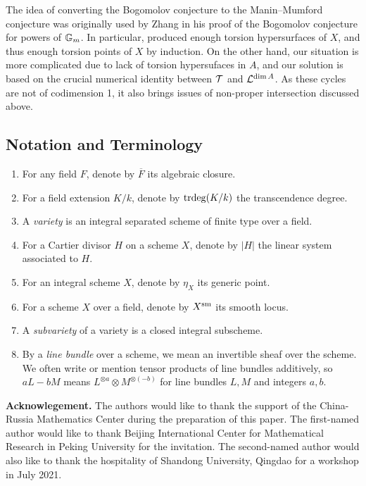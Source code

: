 The idea of converting the Bogomolov conjecture to the Manin--Mumford conjecture was originally used by Zhang \cite{Zhang1992,Zhang1995a} in his proof of the Bogomolov conjecture for powers of ${\mathbb G}_m$.
In particular, \cite[Lemma 6.6]{Zhang1995a} produced enough torsion hypersurfaces of $X$, and thus enough torsion points of $X$ by induction.
On the other hand, our situation is more complicated due to lack of torsion hypersufaces in $A$, and our solution is based on the crucial numerical identity between ${\mathcal T}$ and ${\mathcal L}^{\dim A}$. As these cycles are not of codimension 1, it also brings issues of non-proper intersection discussed above.



\subsection{Notation and Terminology}
\begin{enumerate}
\item[$\bullet$] For any field $F$, denote by $\overline F$ its algebraic closure.
\item[$\bullet$] For a field extension $K/k$, denote by ${\mathrm{trdeg}}(K/k)$ the transcendence degree.
\item[$\bullet$] A \emph{variety} is an integral separated scheme of finite type over a field.
\item[$\bullet$] For a Cartier divisor $H$ on a scheme $X$, denote by $|H|$ the linear system associated to $H.$
\item[$\bullet$] For an integral scheme $X$, denote by $\eta_X$ its generic point.
\item[$\bullet$] For a scheme $X$ over a field, denote by $X^{{\rm sm}}$ its smooth locus.
\item[$\bullet$] A \emph{subvariety} of a variety is a closed integral subscheme.
\item[$\bullet$]
By a \emph{line bundle} over a scheme, we mean an invertible sheaf over the scheme.
We often write or mention tensor products of line bundles additively, so $aL-bM$ means
$L^{\otimes a}\otimes M^{\otimes (-b)}$
for line bundles $L,M$ and integers $a,b$.
\end{enumerate}





\textbf{Acknowlegement.}
The authors would like to thank the support of the China-Russia Mathematics Center during the preparation of this paper.
The first-named author would like to thank Beijing International Center for Mathematical Research in Peking University
for the invitation. The second-named author would also like to thank the hospitality of Shandong University, Qingdao for a workshop in July 2021.
